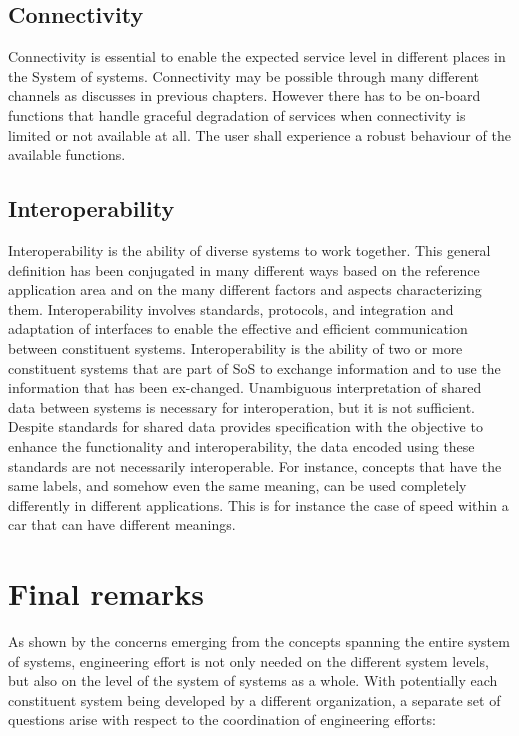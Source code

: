 \documentclass{llncs}
\begin{document}
\subsection*{Connectivity}
 
Connectivity is essential to enable the expected service level in different places in the System of systems. Connectivity may be possible through many different channels as discusses in previous chapters. However there has to be on-board functions that handle graceful degradation of services when connectivity is limited or not available at all. The user shall experience a robust behaviour of the available functions. 

\subsection*{Interoperability} 

Interoperability is the ability of diverse systems to work together. This general definition has been conjugated in many different ways based on the reference application area and on the many different factors and aspects characterizing them. Interoperability involves standards, protocols, and integration and adaptation of interfaces to enable the effective and efficient communication between constituent systems. Interoperability is the ability of two or more constituent systems that are part of SoS to exchange information and to use the information that has been ex-changed. Unambiguous interpretation of shared data between systems is necessary for interoperation, but it is not sufficient. Despite standards for shared data provides specification with the objective to enhance the functionality and interoperability, the data encoded using these standards are not necessarily interoperable. For instance, concepts that have the same labels, and somehow even the same meaning, can be used completely differently in different applications. This is for instance the case of speed within a car that can have different meanings.

\section*{Final remarks}
As shown by the concerns emerging from the concepts spanning the entire system of systems, engineering effort is not only needed on the different system levels, but also on the level of the system of systems as a whole. With potentially each constituent system being developed by a different organization, a separate set of questions arise with respect to the coordination of engineering efforts: 
\end{document}
